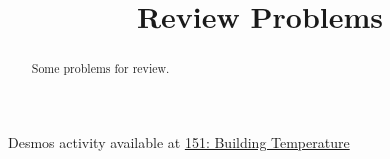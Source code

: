 \documentclass{ximera}
\title{Review Problems}
\begin{document}
\begin{abstract}
Some problems for review.
\end{abstract}
\maketitle


\begin{question}  \label{Q:DFDbgttgt44}

\begin{onlineOnly}
    \begin{center}
\end{center}
\end{onlineOnly}

Desmos activity available at \href{https://www.desmos.com/calculator/oag9lhvgo5}{151: Building Temperature}


\end{question}
\end{document}
